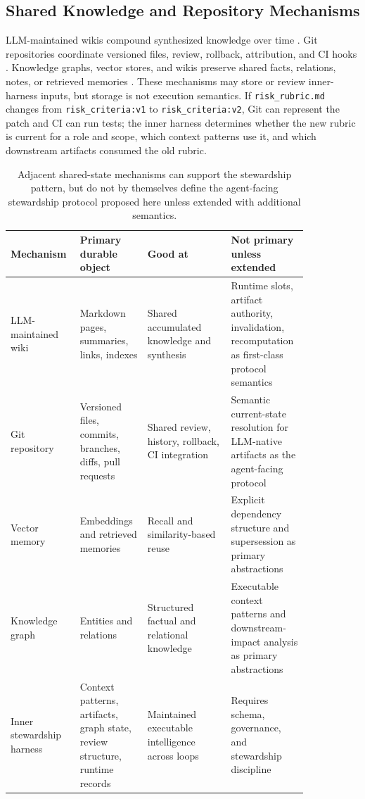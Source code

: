\documentclass{article}
\begin{document}
\subsection{Shared Knowledge and Repository Mechanisms}

LLM-maintained wikis compound synthesized knowledge over time \cite{karpathy2026llmwiki,wen2026knowledgecompounding}. Git repositories coordinate versioned files, review, rollback, attribution, and CI hooks \cite{chacon2014progit}. Knowledge graphs, vector stores, and wikis preserve shared facts, relations, notes, or retrieved memories \cite{hogan2021knowledgegraphs}. These mechanisms may store or review inner-harness inputs, but storage is not execution semantics. If \texttt{risk\_rubric.md} changes from \texttt{risk\_criteria:v1} to \texttt{risk\_criteria:v2}, Git can represent the patch and CI can run tests; the inner harness determines whether the new rubric is current for a role and scope, which context patterns use it, and which downstream artifacts consumed the old rubric.

\begin{table}[H]
\centering
\scriptsize
\begin{tabular}{p{0.16\linewidth}p{0.21\linewidth}p{0.26\linewidth}p{0.21\linewidth}}
\toprule
\textbf{Mechanism} & \textbf{Primary durable object} & \textbf{Good at} & \textbf{Not primary unless extended} \\
\midrule
LLM-maintained wiki & Markdown pages, summaries, links, indexes & Shared accumulated knowledge and synthesis & Runtime slots, artifact authority, invalidation, recomputation as first-class protocol semantics \\
Git repository & Versioned files, commits, branches, diffs, pull requests & Shared review, history, rollback, CI integration & Semantic current-state resolution for LLM-native artifacts as the agent-facing protocol \\
Vector memory & Embeddings and retrieved memories & Recall and similarity-based reuse & Explicit dependency structure and supersession as primary abstractions \\
Knowledge graph & Entities and relations & Structured factual and relational knowledge & Executable context patterns and downstream-impact analysis as primary abstractions \\
Inner stewardship harness & Context patterns, artifacts, graph state, review structure, runtime records & Maintained executable intelligence across loops & Requires schema, governance, and stewardship discipline \\
\bottomrule
\end{tabular}
\caption{Adjacent shared-state mechanisms can support the stewardship pattern, but do not by themselves define the agent-facing stewardship protocol proposed here unless extended with additional semantics.}
\label{tab:shared-state-mechanisms}
\end{table}
\end{document}
